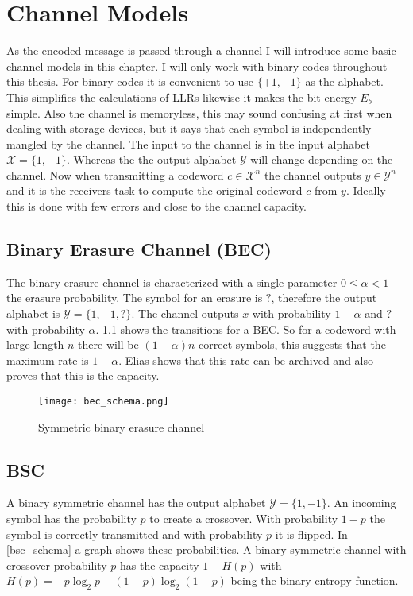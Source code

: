 
\chapter{Channel Models}
As the encoded message is passed through a channel I will introduce some basic channel models in this chapter. I will only work with binary codes throughout this thesis. For binary codes it is convenient to use $\{ +1, -1\}$
 as the alphabet. This simplifies the calculations of LLRs likewise it makes the bit energy $E_b$ simple. Also the channel is memoryless, this may sound confusing at first when dealing with storage devices, but it says that each symbol is independently mangled by the channel. The input to the channel is in the input alphabet $\mathcal{X} = \{1, -1\}$. Whereas the the output alphabet $\mathcal{Y}$ will change depending on the channel. Now when transmitting a codeword $c \in \mathcal{X}^n$ the channel outputs $y \in \mathcal{Y}^n$ and it is the receivers task to compute the original codeword $c$ from $y$. Ideally this is done with few errors and close to the channel capacity.

\section{Binary Erasure Channel (BEC)}
The binary erasure channel is characterized with a single parameter $0 \leq \alpha < 1$ the erasure probability. The symbol for an erasure is $?$, therefore the output alphabet is $\mathcal{Y} = \{1, -1, ?\}$. The channel outputs $x$ with probability $1 - \alpha$ and $?$ with probability $\alpha$. \cref{bec_schema} shows the transitions for a BEC. So for a codeword with large length $n$ there will be $(1 - \alpha)n$ correct symbols, this suggests that the maximum rate is $1 - \alpha$. Elias\cite{El55} shows that this rate can be archived and also proves that this is the capacity.

\begin{figure}
	\texttt{[image: bec\_schema.png]}
	\centering
	\caption{Symmetric binary erasure channel}
	\label{bec_schema}
\end{figure}


\section{BSC}
A binary symmetric channel has the output alphabet $\mathcal{Y} = \{1, -1\}$. An incoming symbol has the probability $p$ to create a crossover. With probability $1 - p$ the symbol is correctly transmitted and with probability $p$ it is flipped. In \cref{bsc_schema} a graph shows these probabilities. A binary symmetric channel with crossover probability $p$ has the capacity $1 - H(p)$ with $H(p) = -p \log_2 p - (1 - p) \log_2 (1 - p)$ being the binary entropy function.


